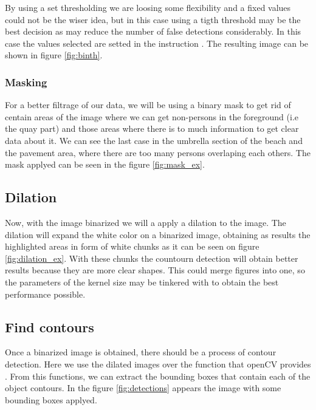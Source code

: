 \documentclass[10pt]{article}
\begin{document}


By using a set thresholding we are loosing some flexibility and a fixed values could not be the wiser idea, but in this case using a tigth threshold may be the best decision as may reduce the number of false detections considerably. In this case the values selected are setted in the instruction . The resulting image can be shown in figure \ref{fig:binth}.



\subsubsection*{Masking}
For a better filtrage of our data, we will be using a binary mask to get rid of centain areas of the image where we can get non-persons in the foreground (i.e the quay part) and those areas where there is to much information to get clear data about it. We can see the last case in the umbrella section of the beach and the pavement area, where there are too many persons overlaping each others. The mask applyed can be seen in the figure \ref{fig:mask_ex}.



\subsection{Dilation}
Now, with the image binarized we will a apply a dilation to the image. The dilation will expand the white color on a binarized image, obtaining as results the highlighted areas in form of white chunks as it can be seen on figure \ref{fig:dilation_ex}. With these chunks the countourn detection will obtain better results because they are more clear shapes. This could merge figures into one, so the parameters of the kernel size may be tinkered with to obtain the best performance possible.



\subsection{Find contours}
Once a binarized image is obtained, there should be a process of contour detection. Here we use the dilated images over the function that openCV provides . From this functions, we can extract the bounding boxes that contain each of the object contours. In the figure \ref{fig:detections} appears the image with some bounding boxes applyed.
\end{document}
